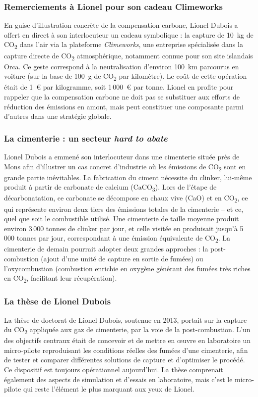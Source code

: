 \subsubsection{Remerciements à Lionel pour son cadeau Climeworks}
En guise d'illustration concrète de la compensation carbone, Lionel Dubois a offert en direct à son interlocuteur un cadeau symbolique : la capture de 10~kg de CO\textsubscript{2} dans l'air via la plateforme \textit{Climeworks}, une entreprise spécialisée dans la capture directe de CO\textsubscript{2} atmosphérique, notamment connue pour son site islandais Orca. Ce geste correspond à la neutralisation d'environ 100~km parcourus en voiture (sur la base de 100~g de CO\textsubscript{2} par kilomètre). Le coût de cette opération était de 1~€ par kilogramme, soit 1\,000~€ par tonne. Lionel en profite pour rappeler que la compensation carbone ne doit pas se substituer aux efforts de réduction des émissions en amont, mais peut constituer une composante parmi d'autres dans une stratégie globale.

\subsubsection{La cimenterie : un secteur \textit{hard to abate}}
Lionel Dubois a emmené son interlocuteur dans une cimenterie située près de Mons afin d'illustrer un cas concret d'industrie où les émissions de CO\textsubscript{2} sont en grande partie inévitables. La fabrication du ciment nécessite du clinker, lui-même produit à partir de carbonate de calcium (CaCO\textsubscript{3}). Lors de l'étape de décarbonatation, ce carbonate se décompose en chaux vive (CaO) et en CO\textsubscript{2}, ce qui représente environ deux tiers des émissions totales de la cimenterie -- et ce, quel que soit le combustible utilisé. Une cimenterie de taille moyenne produit environ 3\,000 tonnes de clinker par jour, et celle visitée en produisait jusqu'à 5\,000 tonnes par jour, correspondant à une émission équivalente de CO\textsubscript{2}. La cimenterie de demain pourrait adopter deux grandes approches : la post-combustion (ajout d'une unité de capture en sortie de fumées) ou l'oxycombustion (combustion enrichie en oxygène générant des fumées très riches en CO\textsubscript{2}, facilitant leur récupération).

\subsubsection{La thèse de Lionel Dubois}
La thèse de doctorat de Lionel Dubois, soutenue en 2013, portait sur la capture du CO\textsubscript{2} appliquée aux gaz de cimenterie, par la voie de la post-combustion. L'un des objectifs centraux était de concevoir et de mettre en \oe{}uvre en laboratoire un micro-pilote reproduisant les conditions réelles des fumées d'une cimenterie, afin de tester et comparer différentes solutions de capture et d'optimiser le procédé. Ce dispositif est toujours opérationnel aujourd'hui. La thèse comprenait également des aspects de simulation et d'essais en laboratoire, mais c'est le micro-pilote qui reste l'élément le plus marquant aux yeux de Lionel.

